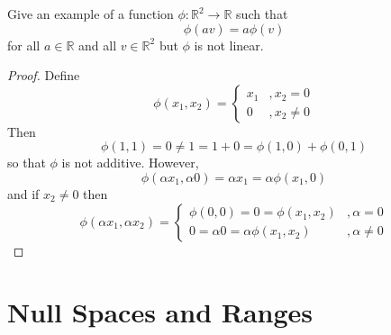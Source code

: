 \begin{exercise} \label{3.A.8}
    Give an example of a function \( \phi: \mathbb{R}^2 \rightarrow \mathbb{R} \) such that
    \[ \phi(av) = a\phi(v) \]
    for all \( a \in \mathbb{R} \) and all \( v \in \mathbb{R}^2 \) but \( \phi \) is not linear.
    
    \begin{proof}
        Define
        \[ \phi(x_1,x_2) = \begin{cases} x_1 & ,x_2=0 \\ 0 & ,x_2 \neq 0 \end{cases} \]
        Then 
        \[ \phi(1,1) = 0 \neq 1 = 1 + 0 = \phi(1,0) + \phi(0,1) \]
        so that \( \phi \) is not additive. However,
        \[ \phi(\alpha x_1, \alpha 0) = \alpha x_1 = \alpha \phi(x_1,0) \]
        and if \( x_2 \neq 0 \) then
        \[ \phi(\alpha x_1, \alpha x_2) = \begin{cases} \phi(0,0)=0=\phi(x_1,x_2) & ,\alpha=0 \\ 0=\alpha0=\alpha\phi(x_1,x_2) & ,\alpha \neq 0 \end{cases} \]
    \end{proof}
\end{exercise}

\begin{exercise} \label{3.A.9}

\end{exercise}

\begin{exercise} \label{3.A.10}

\end{exercise}

\begin{exercise} \label{3.A.11}

\end{exercise}

\begin{exercise} \label{3.A.12}

\end{exercise}

\begin{exercise} \label{3.A.13}

\end{exercise}

\begin{exercise} \label{3.A.14}

\end{exercise}

\section{\label{3.B} Null Spaces and Ranges}

